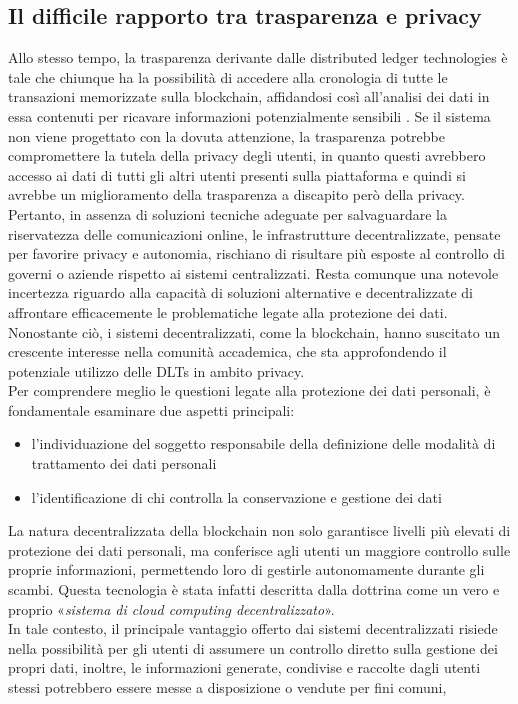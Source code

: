\subsection{Il difficile rapporto tra trasparenza e privacy}
Allo stesso tempo, la trasparenza derivante dalle distributed ledger technologies è tale che chiunque ha la possibilità di accedere alla
cronologia di tutte le transazioni memorizzate sulla blockchain, affidandosi così all’analisi dei dati in essa contenuti per ricavare informazioni potenzialmente sensibili \cite{marr_history_blockchain_2018}.
Se il sistema non viene progettato con la dovuta attenzione, la trasparenza potrebbe compromettere la tutela della privacy degli utenti, in quanto questi avrebbero
accesso ai dati di tutti gli altri utenti presenti sulla piattaforma e quindi si avrebbe un miglioramento della trasparenza 
a discapito però della privacy.\\
Pertanto, in assenza di soluzioni tecniche adeguate per salvaguardare la riservatezza delle comunicazioni online, le infrastrutture decentralizzate, pensate per favorire privacy e autonomia, 
rischiano di risultare più esposte al controllo di governi o aziende rispetto ai sistemi centralizzati.
Resta comunque una notevole incertezza riguardo alla capacità di soluzioni alternative e decentralizzate di affrontare efficacemente le problematiche legate alla protezione dei dati.
Nonostante ciò, i sistemi decentralizzati, come la blockchain, hanno suscitato un crescente interesse nella comunità accademica, che sta approfondendo il potenziale utilizzo delle DLTs in ambito privacy.
\\Per comprendere meglio le questioni legate alla protezione dei dati personali, è fondamentale esaminare due aspetti principali:
\begin{itemize}
    \item l'individuazione del soggetto responsabile della definizione delle modalità di trattamento dei dati personali
    \item l'identificazione di chi controlla la conservazione e gestione dei dati
\end{itemize}
La natura decentralizzata della blockchain non solo garantisce livelli più elevati di protezione dei dati personali, ma conferisce agli utenti un maggiore controllo sulle proprie informazioni, permettendo loro di gestirle autonomamente durante gli scambi. Questa tecnologia è stata infatti descritta dalla dottrina come un vero e proprio «\textit{sistema di cloud computing decentralizzato}».
\\In tale contesto, il principale vantaggio offerto dai sistemi decentralizzati risiede nella possibilità per gli utenti di assumere un controllo diretto sulla gestione dei propri dati, inoltre, le informazioni generate, condivise e raccolte dagli utenti stessi potrebbero essere messe a disposizione o vendute per fini comuni,
